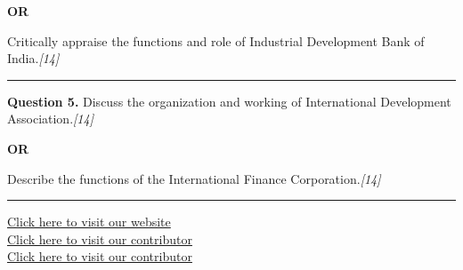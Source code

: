 \documentclass[11pt,a4paper]{article}
\newcommand{\pts}[1]{\hfill   \textit{[#1]}}
\begin{document}
\centerline{   \textbf{OR}}

Critically appraise the functions and role of Industrial Development Bank of India.\pts{14}

\medskip\rule{\linewidth}{0.2pt}




\noindent   \textbf{Question 5.}
Discuss the organization and working of International Development Association.\pts{14}

\centerline{   \textbf{OR}}

Describe the functions of the International Finance Corporation.\pts{14}

\vfill
\rule{\linewidth}{0.4pt}

\begin{center}\small
\href{https://bhu-exam.vercel.app/}{Click here to visit our website}\\[4pt]
\href{https://me-aryan.vercel.app/}{Click here to visit our contributor}\\[4pt]
\href{https://quashan-me.vercel.app/}{Click here to visit our contributor}
\end{center}
\end{document}
